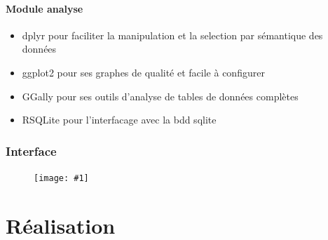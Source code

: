 \documentclass[
	headsepline=on,
	footsepline=on,
	twoside=off,
	abstract=on,
	DIV=10
]{scrreprt}
\newcommand{\img}[1]{
\begin{figure}[H]
	\centering
	\texttt{[image: \#1]}
\end{figure}
}
\begin{document}
				\subsection{Module analyse}
				
				\begin{itemize}
					\item dplyr pour faciliter la manipulation et la selection par sémantique des données
					\item ggplot2 pour ses graphes de qualité et facile à configurer
					\item GGally pour ses outils d'analyse de tables de données complètes
					\item RSQLite pour l'interfacage avec la bdd sqlite
				\end{itemize}
			
			\section{Interface}
				\img{pics/interface.png}

		
			
	\part{Réalisation}
		
		
		
		
		
		
		
		
		
		
\end{document}
